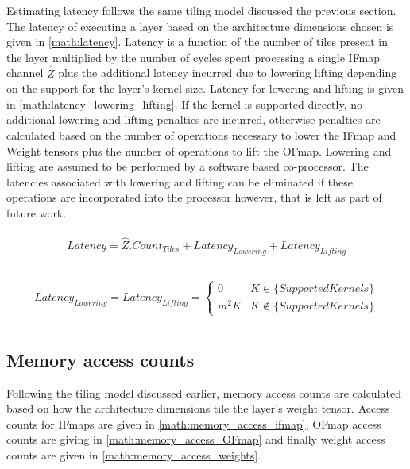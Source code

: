 Estimating latency follows the same tiling model discussed the previous
section. The latency of executing a layer based on the architecture dimensions
chosen is given in \autoref{math:latency}. Latency is a function of the number of
tiles present in the layer multiplied by the number of cycles spent processing a
single IFmap channel $\hat{Z}$ plus the additional latency incurred due to
lowering lifting depending on the support for the layer's kernel size. Latency
for lowering and lifting is given in \autoref{math:latency_lowering_lifting}. If
the kernel is supported directly, no additional lowering and lifting penalties
are incurred, otherwise penalties are calculated based on the number of
operations necessary to lower the IFmap and Weight tensors plus the number of
operations to lift the OFmap. Lowering and lifting are assumed to be performed
by a software based co-processor. The latencies associated with lowering and
lifting can be eliminated if these operations are incorporated into the processor
however, that is left as part of future work. 

\begin{align}
    \begin{gathered}
        Latency = \hat{Z}.Count_{Tiles} + Latency_{Lowering} + Latency_{Lifting} \\
                \end{gathered}
    \label{math:latency}
\end{align}

\begin{align}
    \begin{gathered}
        Latency_{Lowering} = Latency_{Lifting} = \begin{cases} 0 &  K \in \{SupportedKernels\}\\ m^{2}K & K \notin \{SupportedKernels\}\end{cases} \\
                \end{gathered}
    \label{math:latency_lowering_lifting}
\end{align}

\subsection{Memory access counts}
\label{chap:dataflow_dse:exploring:tempo_model:access_counts}

Following the tiling model discussed earlier, memory access counts are
calculated based on how the architecture dimensions tile the layer's weight tensor.
Access counts for IFmaps are given in \autoref{math:memory_access_ifmap}, OFmap
access counts are giving in \autoref{math:memory_access_OFmap} and finally
weight access counts are given in \autoref{math:memory_access_weights}.

